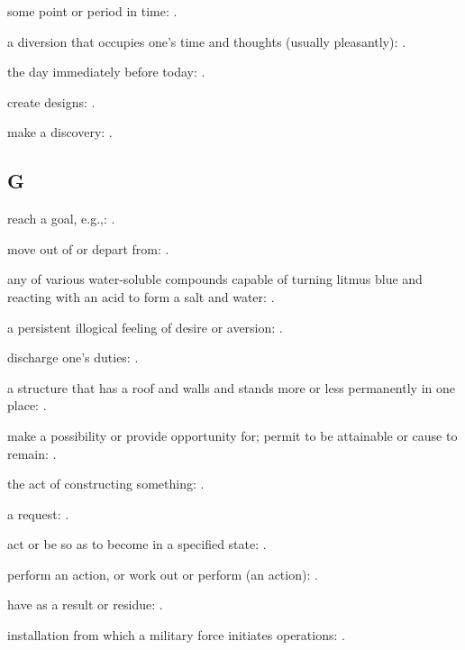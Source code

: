   some point or period in time: .

  a diversion that occupies one's time and thoughts (usually pleasantly):   .

  the day immediately before today: .

  create designs: .

  make a discovery:   .

\subsection*{G}

  reach a goal, e.g.,:   .

  move out of or depart from:   .

  any of various water-soluble compounds capable of turning litmus blue and reacting with an acid to form a salt and water:   .

  a persistent illogical feeling of desire or aversion: .

  discharge one's duties: .

  a structure that has a roof and walls and stands more or less permanently in one place:   .

  make a possibility or provide opportunity for; permit to be attainable or cause to remain:   .

  the act of constructing something:   .

  a request: .

  act or be so as to become in a specified state: .

  perform an action, or work out or perform (an action):   .

  have as a result or residue:   .

  installation from which a military force initiates operations:   .

